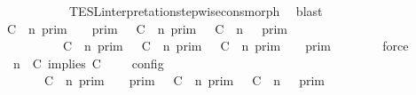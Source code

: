 \begin{isabellebody}
\ \ \ \ \ \ \ \ \ \ \ \ TESL{\isacharunderscore}interpretation{\isacharunderscore}stepwise{\isacharunderscore}cons{\isacharunderscore}morph\ \isamarkupfalse%
\ blast\isanewline
\ \ \ \ \isamarkupfalse%
\ {\isacartoucheopen}{\isasymlbrakk}\ C\ {\isasymnot}{\isasymUp}\ n\ {\isasymrbrakk}\isactrlsub p\isactrlsub r\isactrlsub i\isactrlsub m\ {\isasyminter}\ {\isasymlbrakk}{\isasymlbrakk}\ {\isasymGamma}\ {\isasymrbrakk}{\isasymrbrakk}\isactrlsub p\isactrlsub r\isactrlsub i\isactrlsub m\ {\isasymunion}\ {\isasymlbrakk}\ C\ {\isasymUp}\ n\ {\isasymrbrakk}\isactrlsub p\isactrlsub r\isactrlsub i\isactrlsub m\ {\isasyminter}\ {\isasymlbrakk}{\isasymlbrakk}\ {\isacharparenleft}C\ {\isasymUp}\ n{\isacharparenright}\ {\isacharhash}\ {\isasymGamma}\ {\isasymrbrakk}{\isasymrbrakk}\isactrlsub p\isactrlsub r\isactrlsub i\isactrlsub m\isanewline
\ \ \ \ \ \ \ \ \ {\isacharequal}\ {\isacharparenleft}{\isasymlbrakk}\ C\ {\isasymnot}{\isasymUp}\ n\ {\isasymrbrakk}\isactrlsub p\isactrlsub r\isactrlsub i\isactrlsub m\ {\isasymunion}\ {\isasymlbrakk}\ C\ {\isasymUp}\ n\ {\isasymrbrakk}\isactrlsub p\isactrlsub r\isactrlsub i\isactrlsub m\ {\isasyminter}\ {\isasymlbrakk}\ C\ {\isasymUp}\ n\ {\isasymrbrakk}\isactrlsub p\isactrlsub r\isactrlsub i\isactrlsub m{\isacharparenright}\ {\isasyminter}\ {\isasymlbrakk}{\isasymlbrakk}\ {\isasymGamma}\ {\isasymrbrakk}{\isasymrbrakk}\isactrlsub p\isactrlsub r\isactrlsub i\isactrlsub m{\isacartoucheclose}\isanewline
\ \ \ \ \ \ \isamarkupfalse%
\ force\isanewline
\ \ \ \ \isamarkupfalse%
\ {\isacartoucheopen}{\isasymlbrakk}\ {\isasymGamma}{\isacharcomma}\ n\ {\isasymTurnstile}\ {\isacharparenleft}{\isacharparenleft}C\ implies\ C\ {\isacharhash}\ {\isasymPsi}{\isacharparenright}\ {\isasymtriangleright}\ {\isasymPhi}\ {\isasymrbrakk}\isactrlsub c\isactrlsub o\isactrlsub n\isactrlsub f\isactrlsub i\isactrlsub g\isanewline
\ \ \ \ \ \ {\isacharequal}\ {\isacharparenleft}{\isasymlbrakk}\ C\ {\isasymnot}{\isasymUp}\ n\ {\isasymrbrakk}\isactrlsub p\isactrlsub r\isactrlsub i\isactrlsub m\ {\isasyminter}\ {\isasymlbrakk}{\isasymlbrakk}\ {\isasymGamma}\ {\isasymrbrakk}{\isasymrbrakk}\isactrlsub p\isactrlsub r\isactrlsub i\isactrlsub m\ {\isasymunion}\ {\isasymlbrakk}\ C\ {\isasymUp}\ n\ {\isasymrbrakk}\isactrlsub p\isactrlsub r\isactrlsub i\isactrlsub m\ {\isasyminter}\ {\isasymlbrakk}{\isasymlbrakk}\ {\isacharparenleft}C\ {\isasymUp}\ n{\isacharparenright}\ {\isacharhash}\ {\isasymGamma}\ {\isasymrbrakk}{\isasymrbrakk}\isactrlsub p\isactrlsub r\isactrlsub i\isactrlsub m{\isacharparenright}\isanewline

\end{isabellebody}
